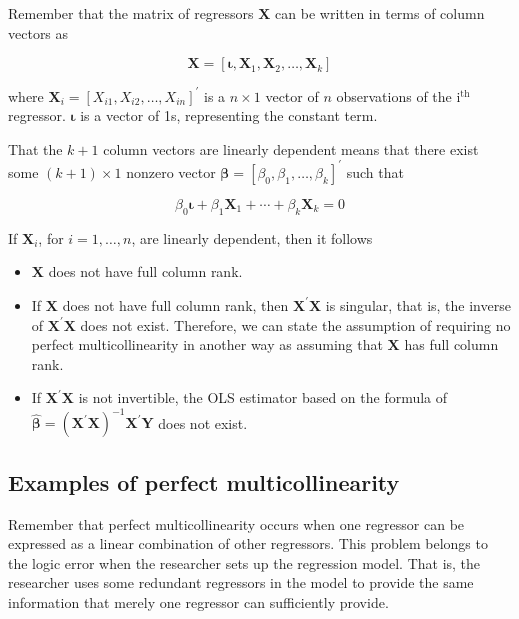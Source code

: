 \documentclass[a4paper,11pt]{article}
\begin{document}
Remember that the matrix of regressors \(\mathbf{X}\) can be written in
terms of column vectors as
\begin{LaTeX}
\[
\mathbf{X} = [\boldsymbol{\iota}, \boldsymbol{X}_1, \boldsymbol{X}_2, \ldots, \boldsymbol{X}_k ]
\]
\end{LaTeX}
where \(\boldsymbol{X}_i = [X_{i1}, X_{i2}, \ldots, X_{in}]^{\prime}\)
is a \(n \times 1\) vector of \(n\) observations of the i\(^{\text{th}}\)
regressor. \(\boldsymbol{\iota}\) is a vector of 1s, representing the
constant term.

That the \(k+1\) column vectors are linearly dependent means that there
exist some \((k+1) \times 1\) nonzero vector \(\boldsymbol{\beta} =
[\beta_0, \beta_1, \ldots, \beta_k]^{\prime}\) such that
\begin{LaTeX}
\[
\beta_0 \boldsymbol{\iota} + \beta_1 \boldsymbol{X}_1 + \cdots + \beta_k
\boldsymbol{X}_k = 0 \]
\end{LaTeX}
If \(\boldsymbol{X}_i\), for \(i=1,\ldots,n\), are linearly dependent,
then it follows
\begin{itemize}
\item \(\mathbf{X}\) does not have full column rank.
\item If \(\mathbf{X}\) does not have full column rank, then
\(\mathbf{X}^{\prime} \mathbf{X}\) is singular, that is, the inverse
of \(\mathbf{X}^{\prime} \mathbf{X}\) does not exist. Therefore, we
can state the assumption of requiring no perfect multicollinearity
in another way as assuming that \(\mathbf{X}\) has full column rank.
\item If \(\mathbf{X}^{\prime} \mathbf{X}\) is not invertible, the OLS
estimator based on the formula of \(\boldsymbol{\hat{\beta}} =
  (\mathbf{X}^{\prime} \mathbf{X})^{-1} \mathbf{X}^{\prime}
  \mathbf{Y}\) does not exist.
\end{itemize}

\subsection{Examples of perfect multicollinearity}
\label{sec:orgdf89bdb}
Remember that perfect multicollinearity occurs when one regressor can
be expressed as a linear combination of other regressors. This problem
belongs to the logic error when the researcher sets up the regression
model. That is, the researcher uses some redundant regressors in the
model to provide the same information that merely one regressor can
sufficiently provide.
\end{document}

